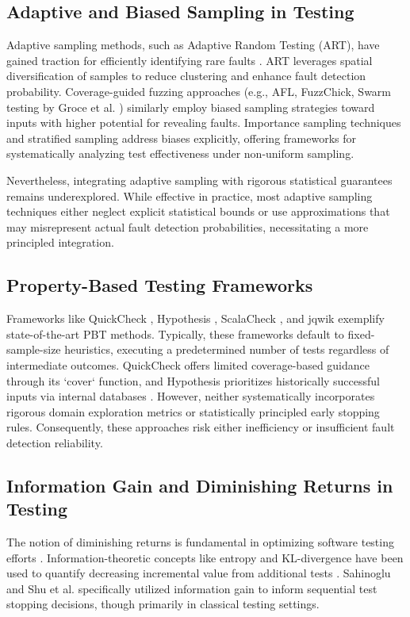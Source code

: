 \subsection{Adaptive and Biased Sampling in Testing}
Adaptive sampling methods, such as Adaptive Random Testing (ART), have gained traction for efficiently identifying rare faults \cite{Chen2007}. ART leverages spatial diversification of samples to reduce clustering and enhance fault detection probability. Coverage-guided fuzzing approaches (e.g., AFL, FuzzChick, Swarm testing by Groce et al. \cite{Groce2014}) similarly employ biased sampling strategies toward inputs with higher potential for revealing faults. Importance sampling techniques \cite{Duran1984, Ntafos1988} and stratified sampling \cite{Mills1972} address biases explicitly, offering frameworks for systematically analyzing test effectiveness under non-uniform sampling.

Nevertheless, integrating adaptive sampling with rigorous statistical guarantees remains underexplored. While effective in practice, most adaptive sampling techniques either neglect explicit statistical bounds or use approximations that may misrepresent actual fault detection probabilities, necessitating a more principled integration.

\subsection{Property-Based Testing Frameworks}
Frameworks like QuickCheck \cite{Hughes2007}, Hypothesis \cite{MacIver2019}, ScalaCheck \cite{Nilsson2014}, and jqwik \cite{Link2020} exemplify state-of-the-art PBT methods. Typically, these frameworks default to fixed-sample-size heuristics, executing a predetermined number of tests regardless of intermediate outcomes. QuickCheck offers limited coverage-based guidance through its `cover` function, and Hypothesis prioritizes historically successful inputs via internal databases \cite{MacIver2019}. However, neither systematically incorporates rigorous domain exploration metrics or statistically principled early stopping rules. Consequently, these approaches risk either inefficiency or insufficient fault detection reliability.

\subsection{Information Gain and Diminishing Returns in Testing}
The notion of diminishing returns is fundamental in optimizing software testing efforts \cite{Myers2011}. Information-theoretic concepts like entropy and KL-divergence have been used to quantify decreasing incremental value from additional tests \cite{Xu2016, Shi2014, Huang2003}. Sahinoglu \cite{Sahinoglu2003} and Shu et al. \cite{Shu2015} specifically utilized information gain to inform sequential test stopping decisions, though primarily in classical testing settings.

